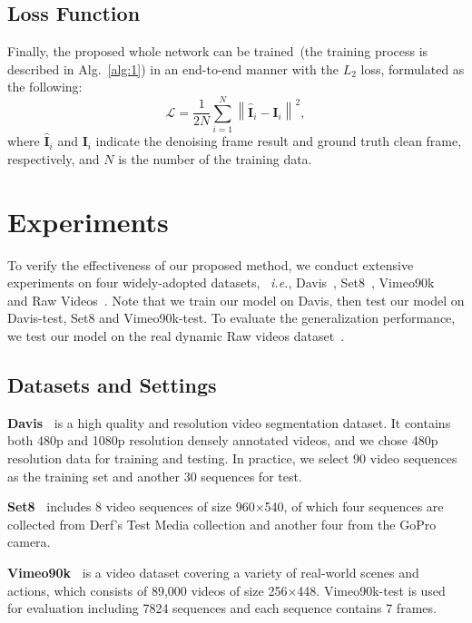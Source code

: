 \documentclass[journal]{IEEEtran}
\begin{document}
\subsection{Loss Function}
Finally, the proposed whole network can be trained~(the training process is described in Alg.~\ref{alg:1}) in an end-to-end manner with the $L_{2}$ loss, formulated as the following:
\begin{equation} 
\mathcal{L}=\frac{1}{2 N} \sum_{i=1}^{N}\left\|\hat{\mathbf{I}}_{i}-{\mathbf{I}}_{i}\right\|^{2} ,
\end{equation}
where $\hat{\mathbf{I}}_{i}$ and ${\mathbf{I}}_{i}$ indicate the denoising frame result and ground truth clean frame, respectively, and $N$ is the number of the training data. 


\section{Experiments}

To verify the effectiveness of our proposed method, we conduct extensive experiments on four widely-adopted datasets, ~\emph{i.e.}, Davis~\cite{khoreva2018video}, Set8~\cite{Tassano2020FastDVDnetTR}, Vimeo90k~\cite{xue2019video} and Raw Videos~\cite{Yue_2020_CVPR}. Note that we train our model on Davis, then test our model on Davis-test, Set8 and Vimeo90k-test. To evaluate the generalization performance, we test our model on the real dynamic Raw videos dataset~\cite{Yue_2020_CVPR}.

\subsection{Datasets and Settings}


\noindent
\textbf{Davis~\cite{khoreva2018video}} is a high quality and resolution video segmentation dataset. It contains both 480p and 1080p resolution densely annotated videos, and we chose 480p resolution data for training and testing. In practice, we select 90 video sequences as the training set and another 30 sequences for test. 

\noindent
\textbf{Set8~\cite{Tassano2020FastDVDnetTR}} includes 8 video sequences of size 960$\times$540, of which four sequences are collected from Derf’s Test Media collection and another four from the GoPro camera. 

\noindent
\textbf{Vimeo90k~\cite{xue2019video}} is a video dataset covering a variety of real-world scenes and actions, which consists of 89,000 videos of size 256$\times$448. Vimeo90k-test is used for evaluation including 7824 sequences and each sequence contains 7 frames.
\end{document}
